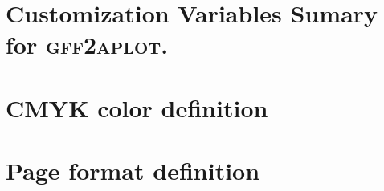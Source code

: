 \documentclass[11pt]{article}
\newcommand{\sctn}[1]{\section{#1}}
\def\prog{\textsc{\textbf{gff2aplot}}}
\begin{document}
\newpage

\sctn{Customization Variables Sumary for \prog.}


\newpage
\landscape
\begin{center}
\begin{footnotesize}
\setlength{\parindent}{-0.45cm}

  
  \vskip 1cm
  
\newpage
  
\newpage
  
  \vskip 1cm
  
  \vskip 1cm
  

\newpage

  
  \vskip 1cm

  
  \vskip 1cm

  
  \vskip 1cm

  
  \vskip 1cm

  

\end{footnotesize}
\end{center}
\newpage
\endlandscape

\sctn{CMYK color definition}



\newpage

\sctn{Page format definition}


\end{document}
